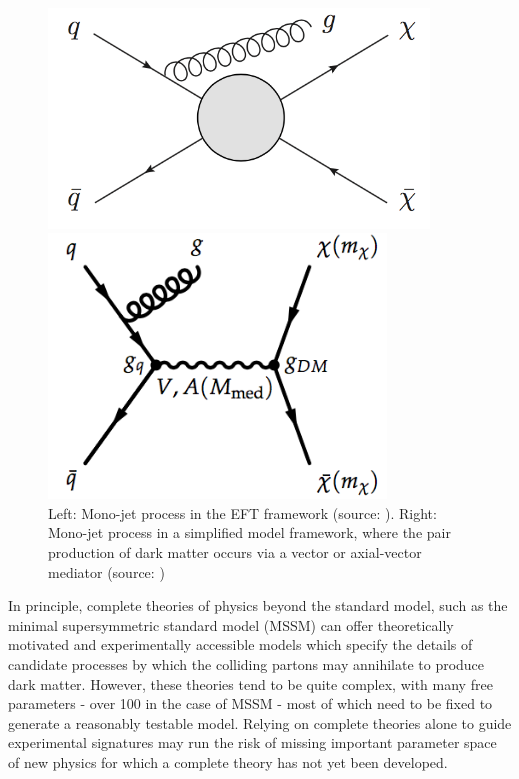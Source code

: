 \documentclass[12pt]{article}
\begin{document}
\begin{figure}[H]
	\centering
	\begin{minipage}[b]{0.45\textwidth}
	\includegraphics[width=0.9\textwidth]{figures/EFT_Signature.png}
	\end{minipage}
	\begin{minipage}[b]{0.45\textwidth}
	\includegraphics[width=0.8\textwidth]{figures/simplified_model.png}
	\end{minipage}
	\caption[]{Left: Mono-jet process in the EFT framework (source: \cite{beyond_eft}). Right: Mono-jet process in a simplified model framework, where the pair production of dark matter occurs via a vector or axial-vector mediator (source: \cite{dm_forum})}
	\label{fig:eft_simplified_model}
\end{figure}

In principle, complete theories of physics beyond the standard model, such as the minimal supersymmetric standard model (MSSM) \cite{mssm} can offer theoretically motivated and experimentally accessible models which specify the details of candidate processes by which the colliding partons may annihilate to produce dark matter. However, these theories tend to be quite complex, with many free parameters - over 100 in the case of MSSM \cite{DM_colliders} - most of which need to be fixed to generate a reasonably testable model. Relying on complete theories alone to guide experimental signatures may run the risk of missing important parameter space of new physics for which a complete theory has not yet been developed. 
\end{document}

